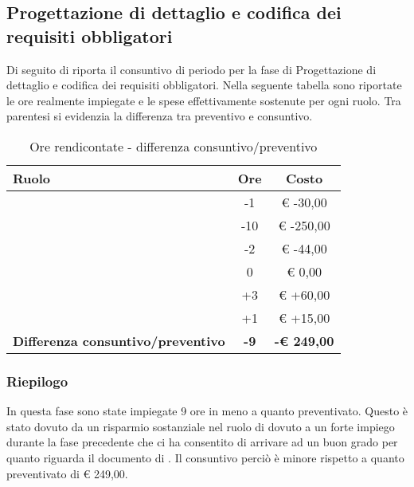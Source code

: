 


	\subsection{Progettazione di dettaglio e codifica dei requisiti obbligatori} %
	\label{sub:consuntivo_progettazione_di_dettaglio_e_codifica_dei_requisiti_obbligatori}
		Di seguito di riporta il consuntivo di periodo per la fase di Progettazione di dettaglio e codifica dei requisiti obbligatori. \newline
		Nella seguente tabella sono riportate le ore realmente impiegate e le spese effettivamente sostenute per ogni ruolo. Tra parentesi si evidenzia la differenza tra preventivo e consuntivo.
		\begin{table}[!h]
			\begin{center}
				\begin{tabularx}{0.90\textwidth}{|X|c|c|}
					\hline
					\textbf{Ruolo} & \textbf{Ore} & \textbf{Costo} \\
					\hline
					\roleProjectManager & -1 & \euro{} -30,00 \\
					\hline
					\roleAnalyst & -10 &  \euro{} -250,00 \\
					\hline
					\roleDesigner & -2 & \euro{} -44,00 \\
					\hline
					\roleAdministrator & 0  & \euro{} 0,00 \\
					\hline
					\roleProgrammer & +3 & \euro{} +60,00 \\
					\hline
					\roleVerifier & +1 & \euro{} +15,00 \\
					\hline
					\textbf{Differenza consuntivo/preventivo} & \textbf{-9} & \textbf{-\euro{} 249,00} \\
					\hline
				\end{tabularx}
			\end{center}
		\caption{Ore rendicontate - differenza consuntivo/preventivo}
		\end{table}

		\subsubsection{Riepilogo} %
		In questa fase sono state impiegate 9 ore in meno a quanto preventivato. \newline
		Questo è stato dovuto da un risparmio sostanziale nel ruolo di \roleAnalyst{} dovuto a un forte impiego durante la fase precedente che ci ha consentito di arrivare ad un buon grado per quanto riguarda il documento di \docNameVersionAdR. \newline
		Il consuntivo perciò è minore rispetto a quanto preventivato di \euro{} 249,00.

